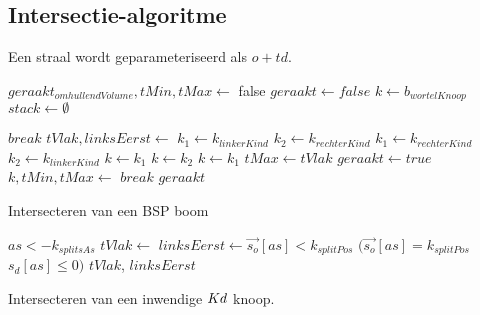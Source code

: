 \subsection{Intersectie-algoritme}
Een straal wordt geparameteriseerd als $o + td$.

\begin{dutchalgorithm}
    \begin{algorithmic}       
            \State $geraakt_{omhullendVolume}, tMin, tMax \gets $ 
                \State \Return false
            \EndIf
            \State $geraakt \gets false$
            \State $k \gets b_{wortelKnoop}$
            \State $stack\gets \emptyset$

                    \State $break$
                \EndIf
                    \State $tVlak, linksEerst \gets$ 
                        \State $k_1 \gets k_{linkerKind}$
                        \State $k_2 \gets k_{rechterKind}$
                    \Else
                        \State $k_1 \gets k_{rechterKind}$
                        \State $k_2 \gets k_{linkerKind}$
                    \EndIf
                        \State $k \gets k_1$
                        \State $k \gets k_2$
                    \Else
                        \State {}
                        \State $k \gets k_1$
                        \State $tMax \gets tVlak$ 
                    \EndIf
                \Else
                        \State $geraakt \gets true$
                    \EndIf
                        \State $k, tMin, tMax \gets $
                    \Else
                        \State $break$
                    \EndIf
                \EndIf
            \EndWhile
            \State \Return $geraakt$
        \EndFunction
    \end{algorithmic}
    \caption{Intersecteren van een BSP boom}
\end{dutchalgorithm}
    
\begin{dutchalgorithm}
    \begin{algorithmic}       
            \State $as <- k_{splitsAs}$
            \State $tVlak \gets $ 
            \State $linksEerst \gets \vec{s_o}[as] < k_{splitPos}$ \Or $(\vec{s_o}[as] = k_{splitPos}$ \And $s_d[as] \leq 0)$
            \State \Return $tVlak$, $linksEerst$
        \EndFunction
    \end{algorithmic}
    \caption{Intersecteren van een inwendige $Kd$ knoop.}
\end{dutchalgorithm}


